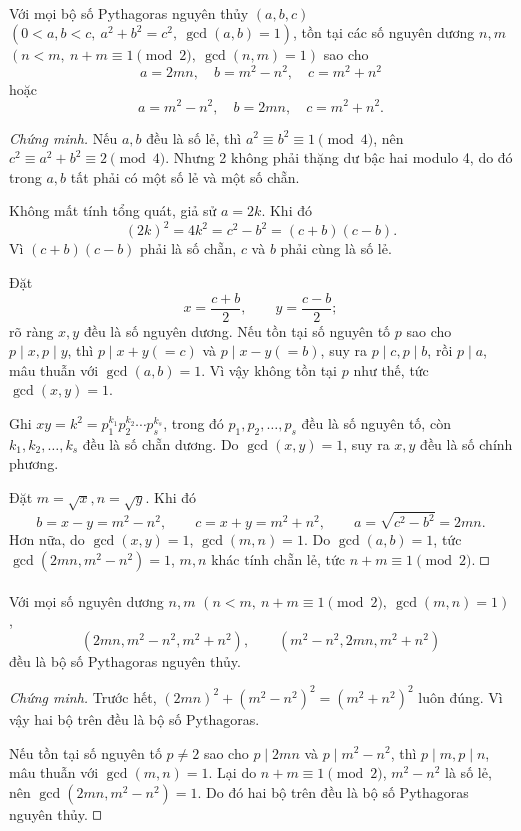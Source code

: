 \documentclass[11pt]{article}
\newcommand{\square}{\mathord{\vcenter{\hrule height .5pt
  \hbox{\vrule width .5pt height 5pt\kern5pt\vrule width .5pt}
  \hrule height .5pt}}}
\begin{document}
\paragraph{}
Với mọi bộ số Pythagoras nguyên thủy \((a,b,c)\)
\((0<a,b<c,\ a^2+b^2=c^2,\ \gcd(a,b)=1)\), tồn tại các số nguyên dương
\(n,m\) \((n<m,\ n+m\equiv1\pmod2,\ \gcd(n,m)=1)\) sao cho
\[
  a=2mn,\quad b=m^2-n^2,\quad c=m^2+n^2
\]
hoặc
\[
  a=m^2-n^2,\quad b=2mn,\quad c=m^2+n^2.
\]

\emph{Chứng minh.}
Nếu \(a,b\) đều là số lẻ, thì \(a^2\equiv b^2\equiv1\pmod4\), nên
\(c^2\equiv a^2+b^2\equiv2\pmod4\). Nhưng 2 không phải thặng dư bậc hai modulo
4, do đó trong \(a,b\) tất phải có một số lẻ và một số chẵn.

Không mất tính tổng quát, giả sử \(a=2k\). Khi đó
\[
  (2k)^2=4k^2=c^2-b^2=(c+b)(c-b).
\]
Vì \((c+b)(c-b)\) phải là số chẵn, \(c\) và \(b\) phải cùng là số lẻ.

Đặt
\[
  x=\frac{c+b}{2},\qquad y=\frac{c-b}{2};
\]
rõ ràng \(x,y\) đều là số nguyên dương. Nếu tồn tại số nguyên tố \(p\) sao
cho \(p\mid x,p\mid y\), thì \(p\mid x+y(=c)\) và \(p\mid x-y(=b)\), suy ra
\(p\mid c,p\mid b\), rồi \(p\mid a\), mâu thuẫn với \(\gcd(a,b)=1\). Vì vậy
không tồn tại \(p\) như thế, tức \(\gcd(x,y)=1\).

Ghi \(xy=k^2=p_1^{k_1}p_2^{k_2}\cdots p_s^{k_s}\), trong đó
\(p_1,p_2,\ldots,p_s\) đều là số nguyên tố, còn
\(k_1,k_2,\ldots,k_s\) đều là số chẵn dương. Do \(\gcd(x,y)=1\), suy ra
\(x,y\) đều là số chính phương.

Đặt \(m=\sqrt{x}, n=\sqrt{y}\). Khi đó
\[
  b=x-y=m^2-n^2,\qquad c=x+y=m^2+n^2,\qquad a=\sqrt{c^2-b^2}=2mn.
\]
Hơn nữa, do \(\gcd(x,y)=1\), \(\gcd(m,n)=1\). Do \(\gcd(a,b)=1\), tức
\(\gcd(2mn,m^2-n^2)=1\), \(m,n\) khác tính chẵn lẻ, tức
\(n+m\equiv1\pmod2\). \(\square\)

\paragraph{}
Với mọi số nguyên dương \(n,m\)
\((n<m,\ n+m\equiv1\pmod2,\ \gcd(m,n)=1)\),
\[
  (2mn,m^2-n^2,m^2+n^2),\qquad
  (m^2-n^2,2mn,m^2+n^2)
\]
đều là bộ số Pythagoras nguyên thủy.

\emph{Chứng minh.}
Trước hết, \((2mn)^2+(m^2-n^2)^2=(m^2+n^2)^2\) luôn đúng. Vì vậy hai bộ trên
đều là bộ số Pythagoras.

Nếu tồn tại số nguyên tố \(p\ne2\) sao cho \(p\mid2mn\) và
\(p\mid m^2-n^2\), thì \(p\mid m,p\mid n\), mâu thuẫn với \(\gcd(m,n)=1\).
Lại do \(n+m\equiv1\pmod2\), \(m^2-n^2\) là số lẻ, nên
\(\gcd(2mn,m^2-n^2)=1\). Do đó hai bộ trên đều là bộ số Pythagoras nguyên
thủy. \(\square\)
\end{document}

